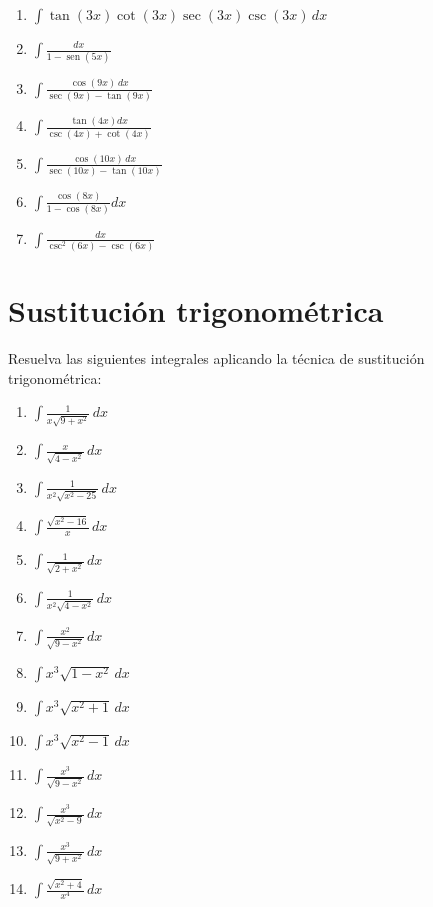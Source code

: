 \documentclass{article}
\begin{document}
\begin{multicols}{2}
\begin{enumerate}
    \item $\displaystyle \int \tan (3x) \cot (3x) \sec (3x) \csc (3x) \, dx$
    \item $\displaystyle \int \frac{dx}{1 - \operatorname{sen} (5x)}$
    \item $\displaystyle \int \frac{\cos (9x) \, dx}{\sec (9x) - \tan (9x)}$
    \item $\displaystyle \int \frac{\tan(4x)dx}{\csc(4x)+\cot(4x)}$
    \item $\displaystyle \int \frac{\cos (10x) \, dx}{\sec (10x) - \tan (10x)}$
    \item $\displaystyle \int \frac{\cos(8x)}{1-\cos(8x)}dx$
    \item $\displaystyle \int \frac{dx}{\csc^2(6x)-\csc(6x)}$    
\end{enumerate}
\newpage
\section*{Sustitución trigonométrica}
Resuelva las siguientes integrales aplicando la técnica de sustitución trigonométrica:
\begin{enumerate}
    \item $\displaystyle \int \frac{1}{x \sqrt{9 + x^2}} \, dx$
    \item $\displaystyle \int \frac{x}{\sqrt{4 - x^2}} \, dx$
    \item $\displaystyle \int \frac{1}{x^2 \sqrt{x^2 - 25}} \, dx$
    \item $\displaystyle \int \frac{\sqrt{x^2 - 16}}{x} \, dx$
    \item $\displaystyle \int \frac{1}{\sqrt{2 + x^2}} \, dx$
    \item $\displaystyle \int \frac{1}{x^2 \sqrt{4 - x^2}} \, dx$
    \item $\displaystyle \int \frac{x^2}{\sqrt{9 - x^2}} \, dx$
    \item $\displaystyle \int x^3 \sqrt{1 - x^2} \, dx$
    \item $\displaystyle \int x^3 \sqrt{x^2 + 1} \, dx$
    \item $\displaystyle \int x^3 \sqrt{x^2 - 1} \, dx$
    \item $\displaystyle \int \frac{x^3}{\sqrt{9 - x^2}} \, dx$
    \item $\displaystyle \int \frac{x^3}{\sqrt{x^2 - 9}} \, dx$
    \item $\displaystyle \int \frac{x^3}{\sqrt{9 + x^2}} \, dx$
    \item $\displaystyle \int \frac{\sqrt{x^2 + 4}}{x^4} \, dx$

\end{enumerate}
\end{multicols}
\end{document}
